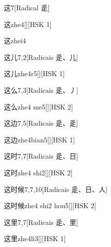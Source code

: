 \begin{entry}{这}{7}[Radical ⾡]
  \begin{phonetics}{这}{zhe4}[][HSK 1]
  \end{phonetics}
  \begin{phonetics}{这}{zhei4}
  \end{phonetics}
\end{entry}

\begin{entry}{这儿}{7,2}[Radicais ⾡、⼉]
  \begin{phonetics}{这儿}{zhe4r5}[][HSK 1]
  \end{phonetics}
\end{entry}

\begin{entry}{这么}{7,3}[Radicais ⾡、⼃]
  \begin{phonetics}{这么}{zhe4 me5}[][HSK 2]
  \end{phonetics}
\end{entry}

\begin{entry}{这边}{7,5}[Radicais ⾡、⾡]
  \begin{phonetics}{这边}{zhe4bian5}[][HSK 1]
  \end{phonetics}
\end{entry}

\begin{entry}{这时}{7,7}[Radicais ⾡、⽇]
  \begin{phonetics}{这时}{zhe4 shi2}[][HSK 2]
  \end{phonetics}
\end{entry}

\begin{entry}{这时候}{7,7,10}[Radicais ⾡、⽇、⼈]
  \begin{phonetics}{这时候}{zhe4 shi2 hou5}[][HSK 2]
  \end{phonetics}
\end{entry}

\begin{entry}{这里}{7,7}[Radicais ⾡、⾥]
  \begin{phonetics}{这里}{zhe4li3}[][HSK 1]
  \end{phonetics}
\end{entry}

